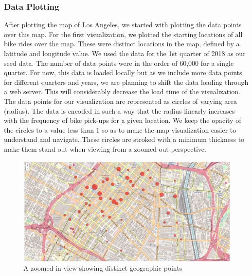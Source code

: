 \subsubsection{Data Plotting}
After plotting the map of Los Angeles, we started with plotting the data points over this map. For the first visualization, we plotted the starting locations of all bike rides over the map. These were distinct locations in the map, defined by a latitude and longitude value. We used the data for the 1st quarter of 2018 as our seed data. The number of data points were in the order of 60,000 for a single quarter. For now, this data is loaded locally but as we include more data points for different quarters and years, we are planning to shift the data loading through a web server. This will considerably decrease the load time of the visualization.\\
The data points for our visualization are represented as circles of varying area (radius). The data is encoded in such a way that the radius linearly increases with the frequency of bike pick-ups for a given location. We keep the opacity of the circles to a value less than 1 so as to make the map visualization easier to understand and navigate. These circles are stroked with a minimum thickness to make them stand out when viewing from a zoomed-out perspective.
\begin{figure}[h]
	\centering %
	\includegraphics[scale=0.20]{figs/zoomedin.PNG}
	\caption{\footnotesize{A zoomed in view showing distinct geographic points}}
	\label{fig:First viz Chart}
	\captionsetup{justification=centering,margin=1cm}
	\vspace{-10pt}
\end{figure}
